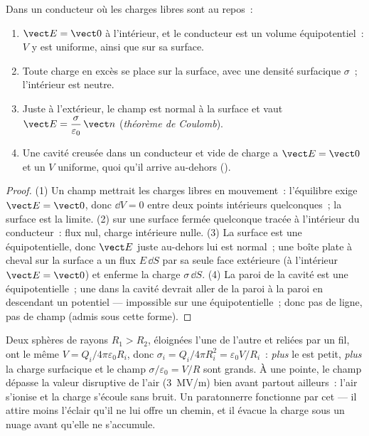 \begin{theorem}\label{thm:b1:potential-capacitors:conductor}
Dans un conducteur où les charges libres sont au repos~:
\begin{enumerate}
  \item $\vect E = \vect 0$ à l'intérieur, et le conducteur est un volume
        équipotentiel~: $V$ y est uniforme, ainsi que sur sa surface.
  \item Toute charge en excès se place sur la surface, avec une densité
        surfacique $\sigma$~; l'intérieur est neutre.
  \item Juste à l'extérieur, le champ est normal à la surface et vaut
        $\vect E = \dfrac{\sigma}{\varepsilon_0}\,\vect n$ (\emph{théorème de Coulomb}).
  \item Une cavité creusée dans un conducteur et vide de charge a $\vect E =
        \vect 0$ et un $V$ uniforme, quoi qu'il arrive au-dehors (\emph{}).
\end{enumerate}
\end{theorem}

\begin{proof}
(1) Un champ mettrait les charges libres en mouvement~: l'équilibre exige $\vect E =
\vect 0$, donc $\dd V = 0$ entre deux points intérieurs quelconques~; la
surface est la limite. (2)  sur une surface
fermée quelconque tracée à l'intérieur du conducteur~: flux nul, charge
intérieure nulle. (3) La surface est une équipotentielle, donc $\vect E$ juste
au-dehors lui est normal~; une boîte plate à cheval sur la surface a un flux
$E\,\dd S$ par sa seule face extérieure (à l'intérieur $\vect E = \vect 0$) et
enferme la charge $\sigma\,\dd S$. (4) La paroi de la cavité est une
équipotentielle~; une  dans la cavité devrait aller de la paroi
à la paroi en descendant un potentiel --- impossible sur une équipotentielle~;
donc pas de ligne, pas de champ (admis sous cette forme).
\end{proof}

\begin{example}\label{ex:b1:potential-capacitors:point}
Deux sphères de rayons $R_1 > R_2$, éloignées l'une de l'autre et reliées par
un fil, ont le même $V = Q_i/4\pi\varepsilon_0R_i$, donc $\sigma_i = Q_i/4\pi R_i^2 = \varepsilon_0V/R_i$~:
\emph{plus} le  est petit, \emph{plus} la charge surfacique
et le champ $\sigma/\varepsilon_0 = V/R$ sont grands. À une pointe, le champ dépasse
la valeur disruptive de l'air (\qty{3}{MV/m}) bien avant partout ailleurs~:
l'air s'ionise et la charge s'écoule sans bruit. Un paratonnerre fonctionne
par cet \emph{} --- il attire moins l'éclair qu'il ne lui offre
un chemin, et il évacue la charge sous un nuage avant qu'elle ne s'accumule.
\end{example}

